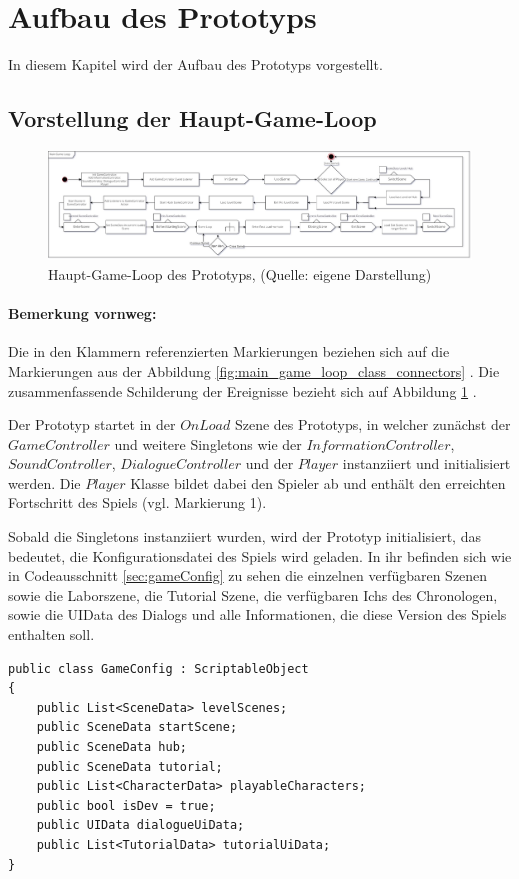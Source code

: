 \section{Aufbau des Prototyps}\label{sec:rework}
In diesem Kapitel wird der Aufbau des Prototyps vorgestellt. 

\subsection{Vorstellung der Haupt-Game-Loop}\label{sec:main-game-loop}
\begin{figure}[ht]
\centering
\includegraphics[width=1\linewidth]{content/pictures/Game-Loop_Prototype.jpg}
\caption{Haupt-Game-Loop des Prototyps, (Quelle: eigene Darstellung)}
\label{fig:main_game_loop}
\end{figure}

\paragraph{Bemerkung vornweg:}
Die in den Klammern referenzierten Markierungen beziehen sich auf die Markierungen aus der Abbildung \ref{fig:main_game_loop_class_connectors} . Die zusammenfassende Schilderung der Ereignisse bezieht sich auf Abbildung \ref{fig:main_game_loop} .


Der Prototyp startet in der $OnLoad$ Szene des Prototyps, in welcher zunächst der $GameController$ und weitere Singletons wie der $InformationController$,\\ $SoundController$, $DialogueController$ und der $Player$ instanziiert und initialisiert werden. Die $Player$ Klasse bildet dabei den Spieler ab und enthält den erreichten Fortschritt des Spiels (vgl. Markierung 1).

Sobald die Singletons instanziiert wurden, wird der Prototyp initialisiert, das bedeutet, die Konfigurationsdatei des Spiels wird geladen. In ihr befinden sich wie in Codeausschnitt \ref{sec:gameConfig} zu sehen die einzelnen verfügbaren Szenen sowie die Laborszene, die Tutorial Szene, die verfügbaren Ichs des Chronologen, sowie die UIData des Dialogs und alle Informationen, die diese Version des Spiels enthalten soll.
\begin{lstlisting}[caption={GameConfig des Prototyps}, label={sec:gameConfig}]
public class GameConfig : ScriptableObject
{
    public List<SceneData> levelScenes;
    public SceneData startScene;
    public SceneData hub;
    public SceneData tutorial;
    public List<CharacterData> playableCharacters;
    public bool isDev = true;
    public UIData dialogueUiData;
    public List<TutorialData> tutorialUiData;
}
\end{lstlisting}

